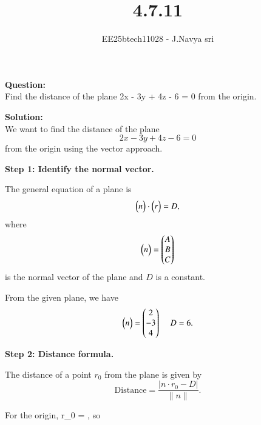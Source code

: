 \documentclass[journal]{IEEEtran}
\begin{document}

\vspace{3cm}

\title{4.7.11}
\author{EE25btech11028 - J.Navya sri}
{\let\newpage\relax\maketitle}


\textbf{Question:} \\
Find the distance of the plane 
2x - 3y + 4z - 6 = 0
from the origin.


\bigskip

\textbf{Solution:} \\
We want to find the distance of the plane 
\begin{equation}
2x - 3y + 4z - 6 = 0
\end{equation} 
from the origin using the vector approach.

\textbf{Step 1: Identify the normal vector.}

The general equation of a plane is 
\begin{equation}
\begin{pmatrix}n\end{pmatrix} \cdot \begin{pmatrix}r\end{pmatrix} = D,
\end{equation}
where 
\begin{equation}
\begin{pmatrix}n\end{pmatrix} = \begin{pmatrix} A \\ B \\ C \end{pmatrix}
\end{equation} 
is the normal vector of the plane and \(D\) is a constant. 

From the given plane, we have
\begin{equation}
\begin{pmatrix}n\end{pmatrix} = \begin{pmatrix} 2 \\ -3 \\ 4\end{pmatrix} \, \quad D = 6.
\end{equation}

\textbf{Step 2: Distance formula.}

The distance of a point \(r_0\) from the plane is given by
\begin{equation}
\text{Distance} = \frac{|{n} \cdot {r}_0 - D|}{\|{n}\|}.
\end{equation}

For the origin, {r}_0 = , so
\end{document}
